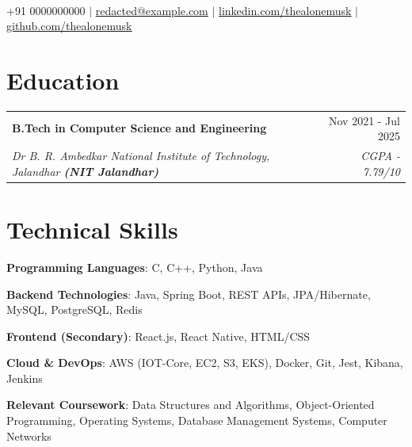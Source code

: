 \documentclass[letterpaper,10pt]{article}
\makeatletter
\newcommand{\resumeSubheading}[4]{
  \vspace{-2pt}\item
    \begin{tabular*}{0.97\textwidth}[t]{l@{\extracolsep{\fill}}r}
      \textbf{#1} & #2 \\
      \textit{\small#3} & \textit{\small #4} \\
    \end{tabular*}\vspace{-7pt}
}
\makeatother
\begin{document}
\begin{center}
    \textbf{} \\ \vspace{5pt}
    \small +91 0000000000 $|$ \href{mailto:redacted@example.com}{\underline{redacted@example.com}} $|$ 
    \href{https://www.linkedin.com/in/thealonemusk/}{\underline{linkedin.com/thealonemusk}} $|$
    \href{https://github.com/thealonemusk}{\underline{github.com/thealonemusk}}
\end{center}

\section{Education}
 
\resumeSubheading
  {B.Tech in Computer Science and Engineering }{Nov 2021 - Jul 2025}
  {Dr B. R. Ambedkar National Institute of Technology, Jalandhar \textbf{(NIT Jalandhar) }} {CGPA - 7.79/10}
\section{Technical Skills}

\begin{itemize}
  \small{
    \item \textbf{Programming Languages}: C, C++, Python, Java
    \item \textbf{Backend Technologies}: Java, Spring Boot, REST APIs, JPA/Hibernate, MySQL, PostgreSQL, Redis

\item \textbf{Frontend (Secondary)}: React.js, React Native, HTML/CSS
    \item \textbf{Cloud \& DevOps}: AWS (IOT-Core, EC2, S3, EKS), Docker, Git, Jest, Kibana, Jenkins
    \item \textbf{Relevant Coursework}: Data Structures and Algorithms, Object-Oriented Programming, Operating Systems, Database Management Systems, Computer Networks
  }
\end{itemize}

\end{document}

